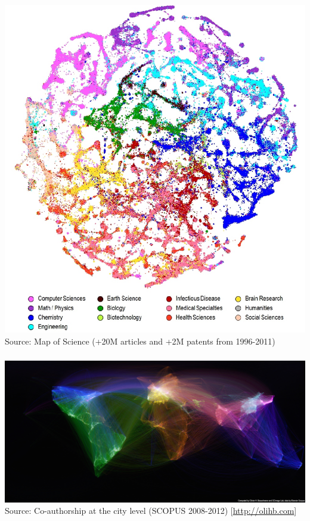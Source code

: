 \documentclass[8pt]{beamer}
\begin{document}

\begin{frame}
\frametitle{\insertsection}
\centering
\includegraphics[width=\linewidth,height=0.8\textheight,keepaspectratio]{mapscience}\\
\tiny Source: Map of Science (+20M articles and +2M patents from 1996-2011)\cite{Boyack2014}
\end{frame}


\begin{frame}
\frametitle{\insertsection}
\centering
\includegraphics[width=\linewidth,height=0.9\textheight,keepaspectratio]{collaboration}\\     
\tiny Source: Co-authorship at the city level (SCOPUS 2008-2012) [\url{http://olihb.com}]
\end{frame}
\end{document}
